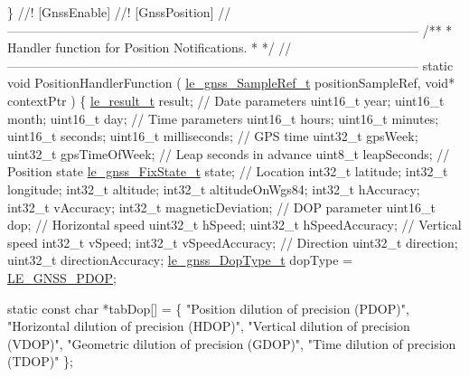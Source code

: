 \begin{DoxyCodeInclude}
{{{{\}\textcolor{comment}{}
\textcolor{comment}{//! [GnssEnable]}
\textcolor{comment}{}\textcolor{comment}{}
\textcolor{comment}{//! [GnssPosition]}
\textcolor{comment}{}\textcolor{comment}{//--------------------------------------------------------------------------------------------------}\textcolor{comment}{}
\textcolor{comment}{/**}
\textcolor{comment}{ * Handler function for Position Notifications.}
\textcolor{comment}{ *}
\textcolor{comment}{ */}
\textcolor{comment}{//--------------------------------------------------------------------------------------------------}
\textcolor{keyword}{static} \textcolor{keywordtype}{void} PositionHandlerFunction
(
    \hyperlink{le__gnss__interface_8h_ac9577035f26d6b7f48615670eb72102a}{le\_gnss\_SampleRef\_t} positionSampleRef,
    \textcolor{keywordtype}{void}* contextPtr
)
\{
    \hyperlink{le__basics_8h_a1cca095ed6ebab24b57a636382a6c86c}{le\_result\_t} result;
    \textcolor{comment}{// Date parameters}
    uint16\_t year;
    uint16\_t month;
    uint16\_t day;
    \textcolor{comment}{// Time parameters}
    uint16\_t hours;
    uint16\_t minutes;
    uint16\_t seconds;
    uint16\_t milliseconds;
    \textcolor{comment}{// GPS time}
    uint32\_t gpsWeek;
    uint32\_t gpsTimeOfWeek;
    \textcolor{comment}{// Leap seconds in advance}
    uint8\_t leapSeconds;
    \textcolor{comment}{// Position state}
    \hyperlink{le__gnss__interface_8h_abcb86aa054abc7a32d2f5a7363387ef1}{le\_gnss\_FixState\_t} state;
    \textcolor{comment}{// Location}
    int32\_t     latitude;
    int32\_t     longitude;
    int32\_t     altitude;
    int32\_t     altitudeOnWgs84;
    int32\_t     hAccuracy;
    int32\_t     vAccuracy;
    int32\_t     magneticDeviation;
    \textcolor{comment}{// DOP parameter}
    uint16\_t dop;
    \textcolor{comment}{// Horizontal speed}
    uint32\_t hSpeed;
    uint32\_t hSpeedAccuracy;
    \textcolor{comment}{// Vertical speed}
    int32\_t vSpeed;
    int32\_t vSpeedAccuracy;
    \textcolor{comment}{// Direction}
    uint32\_t direction;
    uint32\_t directionAccuracy;
    \hyperlink{le__gnss__interface_8h_aa3dbc8648a864e2c1e67095034150678}{le\_gnss\_DopType\_t} dopType = \hyperlink{le__gnss__interface_8h_aa3dbc8648a864e2c1e67095034150678af07053c03690aaf0e246ff9462abaafe}{LE\_GNSS\_PDOP};

    \textcolor{keyword}{static} \textcolor{keyword}{const} \textcolor{keywordtype}{char} *tabDop[] =
    \{
        \textcolor{stringliteral}{"Position dilution of precision (PDOP)"},
        \textcolor{stringliteral}{"Horizontal dilution of precision (HDOP)"},
        \textcolor{stringliteral}{"Vertical dilution of precision (VDOP)"},
        \textcolor{stringliteral}{"Geometric dilution of precision (GDOP)"},
        \textcolor{stringliteral}{"Time dilution of precision (TDOP)"}
    \};

}}}}
\end{DoxyCodeInclude}
